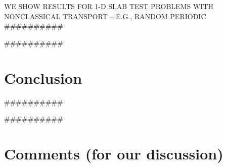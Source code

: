 \documentclass[preprint,12pt]{elsarticle}
\begin{document}
WE SHOW RESULTS FOR 1-D SLAB TEST PROBLEMS WITH NONCLASSICAL TRANSPORT -- E.G., RANDOM PERIODIC\\

\#\#\#\#\#\#\#\#\#\#

\#\#\#\#\#\#\#\#\#\#

\section{Conclusion}\label{sec6}
\setcounter{section}{6}

\#\#\#\#\#\#\#\#\#\#

\#\#\#\#\#\#\#\#\#\#

\section*{Comments (for our discussion)}
\setcounter{section}{4}
\end{document}
